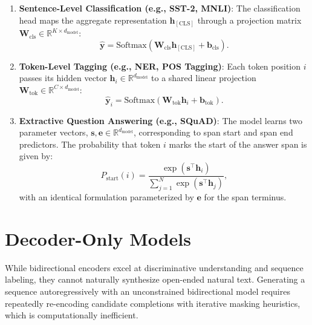 \documentclass[../../../main.tex]{subfiles}
\begin{document}
\begin{enumerate}
    \item \textbf{Sentence-Level Classification (e.g., SST-2, MNLI)}: The classification head maps the aggregate representation $\mathbf{h}_{[\text{CLS}]}$ through a projection matrix $\mathbf{W}_{\text{cls}} \in \mathbb{R}^{K \times d_{\text{model}}}$:
    \begin{equation}
    \hat{\mathbf{y}} = \text{Softmax}(\mathbf{W}_{\text{cls}} \mathbf{h}_{[\text{CLS}]} + \mathbf{b}_{\text{cls}}).
    \label{eq:bert_finetune_seq_classification}
    \end{equation}
    
    \item \textbf{Token-Level Tagging (e.g., NER, POS Tagging)}: Each token position $i$ passes its hidden vector $\mathbf{h}_i \in \mathbb{R}^{d_{\text{model}}}$ to a shared linear projection $\mathbf{W}_{\text{tok}} \in \mathbb{R}^{C \times d_{\text{model}}}$:
    \begin{equation}
    \hat{\mathbf{y}}_i = \text{Softmax}(\mathbf{W}_{\text{tok}} \mathbf{h}_i + \mathbf{b}_{\text{tok}}).
    \label{eq:bert_finetune_token_classification}
    \end{equation}
    
    \item \textbf{Extractive Question Answering (e.g., SQuAD)}: The model learns two parameter vectors, $\mathbf{s}, \mathbf{e} \in \mathbb{R}^{d_{\text{model}}}$, corresponding to span start and span end predictors. The probability that token $i$ marks the start of the answer span is given by:
    \begin{equation}
    P_{\text{start}}(i) = \frac{\exp(\mathbf{s}^\top \mathbf{h}_i)}{\sum_{j=1}^N \exp(\mathbf{s}^\top \mathbf{h}_j)},
    \label{eq:bert_squad_start_prob}
    \end{equation}
    with an identical formulation parameterized by $\mathbf{e}$ for the span terminus.
\end{enumerate}


\section{Decoder-Only Models}
\label{sec:decoder_only_models}

While bidirectional encoders excel at discriminative understanding and sequence labeling, they cannot naturally synthesize open-ended natural text. Generating a sequence autoregressively with an unconstrained bidirectional model requires repeatedly re-encoding candidate completions with iterative masking heuristics, which is computationally inefficient.
\end{document}
